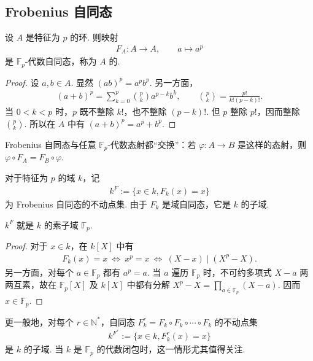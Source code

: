\subsection{Frobenius 自同态}\label{sec:galois-2-4-3}
\begin{proposition*}
设 $A$ 是特征为 $p$ 的环. 则映射
\begin{align*}
F_A:A\longrightarrow A,\qquad a\longmapsto a^p
\end{align*}
是 $\mathbb F_p$-代数自同态，称为 $A$ 的.
\end{proposition*}
\begin{proof}
设 $a,b\in A$. 显然 $(ab)^p=a^pb^p$. 另一方面，
\begin{align*}
(a+b)^p=\sum_{k=0}^p\binom pk a^{p-k}b^k,\qquad \binom pk=\frac{p!}{k!(p-k)!}.
\end{align*}
当 $0<k<p$ 时，$p$ 既不整除 $k!$，也不整除 $(p-k)!$. 但 $p$ 整除 $p!$，因而整除 $\binom pk$. 所以在 $A$ 中有 $(a+b)^p=a^p+b^p$.
\end{proof}
\begin{remark*}
Frobenius 自同态与任意 $\mathbb F_p$-代数态射都``交换''：若 $\varphi:A\longrightarrow B$ 是这样的态射，则 $\varphi\circ F_A=F_B\circ\varphi$.
\end{remark*}
对于特征为 $p$ 的域 $k$，记
\begin{align*}
k^F:=\{x\in k,F_k(x)=x\}
\end{align*}
为 Frobenius 自同态的不动点集. 由于 $F_k$ 是域自同态，它是 $k$ 的子域.
\begin{lemma*}
$k^F$ 就是 $k$ 的素子域 $\mathbb F_p$.
\end{lemma*}
\begin{proof}
对于 $x\in k$，在 $k[X]$ 中有
\begin{align*}
F_k(x)=x\ \Longleftrightarrow\ x^p=x\ \Longleftrightarrow\ (X-x)\mid(X^p-X).
\end{align*}
另一方面，对每个 $a\in\mathbb F_p$ 都有 $a^p=a$. 当 $a$ 遍历 $\mathbb F_p$ 时，不可约多项式 $X-a$ 两两互素，故在 $\mathbb F_p[X]$ 及 $k[X]$ 中都有分解 $X^p-X=\prod_{a\in\mathbb F_p}(X-a)$. 因而 $x\in\mathbb F_p$.
\end{proof}
更一般地，对每个 $r\in\mathbb N^*$，自同态 $F_k^r=F_k\circ F_k\circ\cdots\circ F_k$ 的不动点集
\begin{align*}
k^{F^r}:=\{x\in k,F_k^r(x)=x\}
\end{align*}
是 $k$ 的子域. 当 $k$ 是 $\mathbb F_p$ 的代数闭包时，这一情形尤其值得关注.
